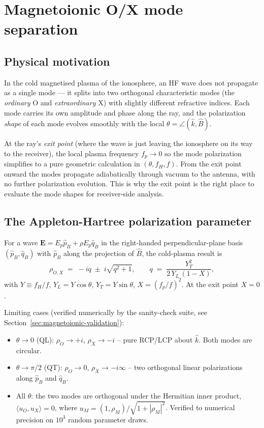 \documentclass[11pt]{article}
\begin{document}
\section{Magnetoionic O/X mode separation}
\label{sec:magnetoionic-ref}

\subsection{Physical motivation}

In the cold magnetised plasma of the ionosphere, an HF wave does not
propagate as a single mode --- it splits into two orthogonal
characteristic modes (the \emph{ordinary} O and \emph{extraordinary} X)
with slightly different refractive indices.  Each mode carries its own
amplitude and phase along the ray, and the polarization \emph{shape}
of each mode evolves smoothly with the local
$\theta = \angle(\hat k, \hat B)$.

At the ray's \emph{exit point} (where the wave is just leaving the
ionosphere on its way to the receiver), the local plasma frequency
$f_p \to 0$ so the mode polarization simplifies to a pure geometric
calculation in $(\theta, f_H, f)$.  From the exit point onward the
modes propagate adiabatically through vacuum to the antenna, with no
further polarization evolution.  This is why the exit point is the
right place to evaluate the mode shapes for receiver-side analysis.

\subsection{The Appleton-Hartree polarization parameter}

For a wave $\mathbf{E} = E_p\hat p_B + \rho E_p\hat q_B$ in the
right-handed perpendicular-plane basis $(\hat p_B, \hat q_B)$ with
$\hat p_B$ along the projection of $\hat B$, the cold-plasma result is
\begin{equation}
\rho_{O,X} \;=\; -iq \;\pm\; i\sqrt{q^2 + 1},
\qquad q \;=\; \frac{Y_T^2}{2\,Y_L\,(1-X)},
\end{equation}
with $Y \equiv f_H/f$, $Y_L = Y\cos\theta$, $Y_T = Y\sin\theta$,
$X = (f_p/f)^2$.  At the exit point $X = 0$.

Limiting cases (verified numerically by the sanity-check suite, see
Section~\ref{sec:magnetoionic-validation}):
\begin{itemize}\itemsep=2pt
\item $\theta \to 0$ (QL): $\rho_O \to +i$, $\rho_X \to -i$ -- pure
      RCP/LCP about $\hat k$.  Both modes are circular.
\item $\theta \to \pi/2$ (QT): $\rho_O \to 0$, $\rho_X \to -i\infty$
      -- two orthogonal linear polarizations along $\hat p_B$ and
      $\hat q_B$.
\item All $\theta$: the two modes are orthogonal under the Hermitian
      inner product, $\langle u_O, u_X\rangle = 0$, where
      $u_M = (1, \rho_M)/\sqrt{1+|\rho_M|^2}$.  Verified to numerical
      precision on $10^3$ random parameter draws.
\end{itemize}
\end{document}
